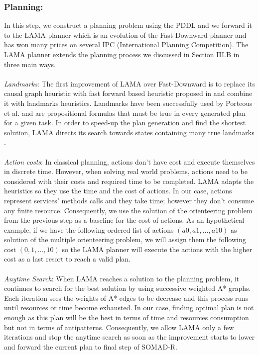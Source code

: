 \documentclass[lnbip]{svmultln}
\begin{document}
\subsubsection{Planning: } In this step, we construct a planning problem using the PDDL and we forward it to the LAMA planner \cite{richter2010lama} which is an evolution of the Fast-Downward planner \cite{helmert2006fast} and has won many prices on several IPC (International Planning Competition). The LAMA planner extends the planning process we discussed in Section III.B in three main ways.
\\ \\
\textit{Landmarks}: The first improvement of LAMA over Fast-Downward is to replace its causal graph heuristic with fast forward based heuristic proposed in \cite{hoffmann2011ff} and combine it with landmarks heuristics. Landmarks have been successfully used by Porteous et al. \cite{porteous2001extraction} and are propositional formulas that must be true in every generated plan for a given task. In order to speed-up the plan generation and find the shortest solution, LAMA directs its search towards states containing many true landmarks \cite{richter2008landmarks}.
\\ \\
\textit{Action costs}: In classical planning, actions don't have cost and execute themselves in discrete time. However, when solving real world problems, actions need to be considered with their costs and required time to be completed. LAMA adapts the heuristics so they use the time and the cost of actions. In our case, actions represent services’ methods calls and they take time; however they don't consume any finite resource. Consequently, we use the solution of the orienteering problem from the previous step as a baseline for the cost of actions. As an hypothetical example, if we have the following ordered list of actions $(a0, a1, ..., a10)$ as solution of the multiple orienteering problem, we will assign them the following cost $(0, 1, ..., 10)$ so the LAMA planner will execute the actions with the higher cost as a last resort to reach a valid plan. 
\\ \\
\textit{Anytime Search}: When LAMA reaches a solution to the planning problem, it continues to search for the best solution by using successive weighted A* graphs. Each iteration sees the weights of A* edges to be decrease and this process runs until resources or time become exhausted. In our case, finding optimal plan is not enough as this plan will be the best in terms of time and resources consumption but not in terms of antipatterns. Consequently, we allow LAMA only a few iterations and stop the anytime search as soon as the improvement starts to lower and forward the current plan to final step of SOMAD-R.
\end{document}
